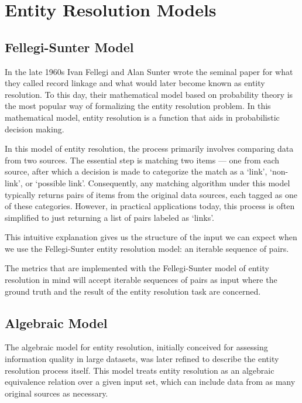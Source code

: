 \documentclass[a4paper,twoside]{article}
\begin{document}
    \section{Entity Resolution Models}\label{sec:models}
    \subsection{Fellegi-Sunter Model}
    In the late 1960s Ivan Fellegi and Alan Sunter wrote the seminal
    paper\cite{fs1969} for what they called record linkage and what would later
    become known as entity resolution.
    To this day, their mathematical model based on probability theory is the
    most popular way of formalizing the entity resolution problem.
    In this mathematical model, entity resolution is a function that aids in 
    probabilistic decision making.
    
    In this model of entity resolution, the process primarily involves comparing
    data from two sources.
    The essential step is matching two items --- one from each source, after
    which a decision is made to categorize the match as a `link', `non-link', or
    `possible link'.
    Consequently, any matching algorithm under this model typically returns
    pairs of items from the original data sources, each tagged as one of these
    categories.
    However, in practical applications today, this process is often simplified
    to just returning a list of pairs labeled as `links'.

    This intuitive explanation gives us the structure of the input we can expect
    when we use the Fellegi-Sunter entity resolution model: an iterable sequence
    of pairs.

    The metrics that are implemented with the Fellegi-Sunter model of entity
    resolution in mind will accept iterable sequences of pairs as input where
    the ground truth and the result of the entity resolution task are concerned.

    \subsection{Algebraic Model}
    The algebraic model for entity resolution, initially conceived for assessing
    information quality in large datasets\cite{tal2007algebraic}, was later
    refined to describe the entity resolution process itself\cite{Tal11}.
    This model treats entity resolution as an algebraic equivalence relation
    over a given input set, which can include data from as many original sources
    as necessary.
    
\end{document}
